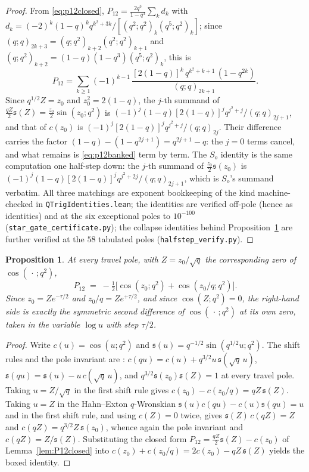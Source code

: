 \documentclass[11pt]{article}
\theoremstyle{plain}
\newtheorem{proposition}[theorem]{Proposition}
\theoremstyle{definition}
\theoremstyle{remark}
\begin{document}
\begin{proof}
From \eqref{eq:p12closed}, $P_{12}=\tfrac{2q^3}{1-q^3}\sum_kd_k$ with
$d_k=(-2)^k(1-q)^kq^{k^2+3k}/[(q^2;q^2)_k(q^5;q^2)_k]$; since
$(q;q)_{2k+3}=(q;q^2)_{k+2}(q^2;q^2)_{k+1}$ and $(q;q^2)_{k+2}=(1-q)(1-q^3)(q^5;q^2)_k$, this is
\begin{equation}\label{eq:p12banked}
 P_{12}=\sum_{k\ge1}(-1)^{k-1}\,\frac{[2(1-q)]^k\,q^{k^2+k+1}\,(1-q^{2k})}{(q;q)_{2k+1}} .
\end{equation}
Since $q^{1/2}Z=z_0$ and $z_0^2=2(1-q)$, the $j$-th summand of
$\tfrac{qZ}2\mathfrak s(Z)=\tfrac{z_0}2\sin(z_0;q^2)$ is
$(-1)^j(1-q)[2(1-q)]^jq^{j^2+j}/(q;q)_{2j+1}$, and that of $c(z_0)$ is
$(-1)^j[2(1-q)]^jq^{j^2+j}/(q;q)_{2j}$. Their difference carries the factor
$(1-q)-(1-q^{2j+1})=q^{2j+1}-q$: the $j=0$ terms cancel, and what remains is
\eqref{eq:p12banked} term by term. The $S_o$ identity is the same computation one half-step down:
the $j$-th summand of $\tfrac{z_0}2\mathfrak s(z_0)$ is
$(-1)^j(1-q)[2(1-q)]^jq^{j^2+2j}/(q;q)_{2j+1}$, which is $S_o$'s summand verbatim. All three
matchings are exponent bookkeeping of the kind machine-checked in \texttt{QTrigIdentities.lean};
the identities are verified off-pole (hence as identities) and at the six exceptional poles to
$10^{-100}$ (\texttt{star\_gate\_certificate.py}); the collapse identities behind
Proposition~\ref{prop:P12second} are further verified at the $58$ tabulated poles
(\texttt{halfstep\_verify.py}).
\end{proof}

\begin{proposition}\label{prop:P12second}
At every travel pole, with $Z=z_0/\sqrt q$ the corresponding zero of $\cos(\,\cdot\,;q^2)$,
\[
 \boxed{\;P_{12}\;=\;-\tfrac12\bigl[\cos(z_0;q^2)+\cos(z_0/q;q^2)\bigr].\;}
\]
Since $z_0=Ze^{-\tau/2}$ and $z_0/q=Ze^{+\tau/2}$, and since $\cos(Z;q^2)=0$, the right-hand side is
exactly the symmetric second difference of $\cos(\,\cdot\,;q^2)$ at its own zero, taken in the
variable $\log u$ with step $\tau/2$.
\end{proposition}

\begin{proof}
Write $c(u)=\cos(u;q^2)$ and $\mathfrak s(u)=q^{-1/2}\sin(q^{1/2}u;q^2)$. The shift rules and the
pole invariant are {\cite[Lemma ``half-step rules and the pole invariant'', \textup{lem:halfstep}]{Bonfioli2026bA}}:
$c(qu)=c(u)+q^{3/2}u\,\mathfrak s(\sqrt q\,u)$, $\mathfrak s(qu)=\mathfrak s(u)-u\,c(\sqrt q\,u)$,
and $q^{3/2}\mathfrak s(z_0)\mathfrak s(Z)=1$ at every travel pole.
Taking $u=Z/\sqrt q$ in the first shift rule gives $c(z_0)-c(z_0/q)=qZ\,\mathfrak s(Z)$. Taking
$u=Z$ in the Hahn--Exton $q$-Wronskian $\mathfrak s(u)c(qu)-c(u)\mathfrak s(qu)=u$ and in the first
shift rule, and using $c(Z)=0$ twice, gives
$\mathfrak s(Z)\,c(qZ)=Z$ and $c(qZ)=q^{3/2}Z\,\mathfrak s(z_0)$, whence again the pole invariant
and $c(qZ)=Z/\mathfrak s(Z)$. Substituting the closed
form $P_{12}=\tfrac{qZ}2\mathfrak s(Z)-c(z_0)$ of Lemma~\ref{lem:P12closed} into
$c(z_0)+c(z_0/q)=2c(z_0)-qZ\,\mathfrak s(Z)$ yields the boxed identity.
\end{proof}
\end{document}
